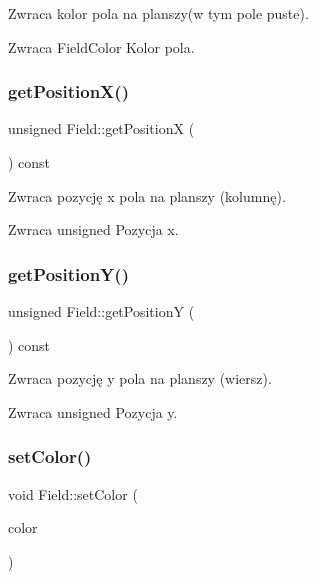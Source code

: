 Zwraca kolor pola na planszy(w tym pole puste). 

\begin{DoxyReturn}{Zwraca}
Field\+Color Kolor pola. 
\end{DoxyReturn}
\mbox{\label{class_field_aac2257afae524dcfc8562da1fb3a08d1}} 
\subsubsection{getPositionX()}
{\footnotesize\ttfamily unsigned Field\+::get\+PositionX (\begin{DoxyParamCaption}{ }\end{DoxyParamCaption}) const}



Zwraca pozycję x pola na planszy (kolumnę). 

\begin{DoxyReturn}{Zwraca}
unsigned Pozycja x. 
\end{DoxyReturn}
\mbox{\label{class_field_a55c384d4f5a6dbeae821b7c378caecdf}} 
\subsubsection{getPositionY()}
{\footnotesize\ttfamily unsigned Field\+::get\+PositionY (\begin{DoxyParamCaption}{ }\end{DoxyParamCaption}) const}



Zwraca pozycję y pola na planszy (wiersz). 

\begin{DoxyReturn}{Zwraca}
unsigned Pozycja y. 
\end{DoxyReturn}
\mbox{\label{class_field_a13592f6d711f4c8a8a30b8c3d611fdfc}} 
\subsubsection{setColor()}
{\footnotesize\ttfamily void Field\+::set\+Color (\begin{DoxyParamCaption}\item[{Field\+Color}]{color }\end{DoxyParamCaption})}



